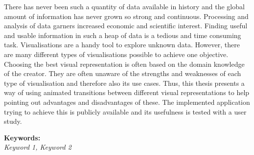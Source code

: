 
There has never been such a quantity of data available in history and the global amount of information has never grown so strong and continuous. Processing and analysis of data garners increased economic and scientific interest. Finding useful and usable information in such a heap of data is a tedious and time consuming task. Visualisations are a handy tool to explore unknown data. However, there are many different types of visualisations possible to achieve one objective. Choosing the best visual representation is often based on the domain knowledge of the creator. They are often unaware of the strengths and weaknesses of each type of visualisation and therefore also its use cases. Thus, this thesis presents a way of using animated transitions between different visual representations to help pointing out advantages and disadvantages of these. The implemented application trying to achieve this is publicly available and its usefulness is tested with a user study.


\textbf{Keywords:}\\
\textit{Keyword 1, Keyword 2}
